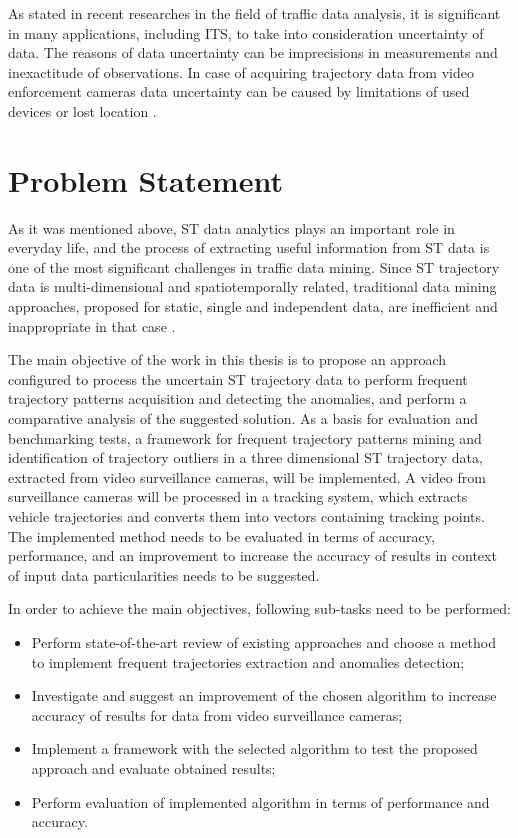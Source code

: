 As stated in recent researches in the field of traffic data analysis, it is significant in many applications, including ITS, to take into consideration uncertainty of data. The reasons of data uncertainty can be imprecisions in measurements and inexactitude of observations. In case of acquiring trajectory data from video enforcement cameras data uncertainty can be caused by limitations of used devices or lost location \cite{inproceedings:14_mpfstsp_gp_ud}.

\section{Problem Statement}

As it was mentioned above, ST data analytics plays an important role in everyday life, and the process of extracting useful information from ST data is one of the most significant challenges in traffic data mining. Since ST trajectory data is multi-dimensional and spatiotemporally related, traditional data mining approaches, proposed for static, single and independent data, are inefficient and inappropriate in that case \cite{article:8_review_mot_cl_alg}.

The main objective of the work in this thesis is to propose an approach configured to process the uncertain ST trajectory data to perform frequent trajectory patterns acquisition and detecting the anomalies, and perform a comparative analysis of the suggested solution. As a basis for evaluation and benchmarking tests, a framework for frequent trajectory patterns mining and identification of trajectory outliers in a three dimensional ST trajectory data, extracted from video surveillance cameras, will be implemented. A video from surveillance cameras will be processed in a tracking system, which extracts vehicle trajectories and converts them into vectors containing tracking points. The implemented method needs to be evaluated in terms of accuracy, performance, and an improvement to increase the accuracy of results in context of input data particularities needs to be suggested. 

In order to achieve the main objectives, following sub-tasks need to be performed:
\begin{itemize}
	\item Perform state-of-the-art review of existing approaches and choose a method to implement frequent trajectories extraction and anomalies detection;
	\item Investigate and suggest an improvement of the chosen algorithm to increase accuracy of results for data from video surveillance cameras;
	\item Implement a framework with the selected algorithm to test the proposed approach and evaluate obtained results;
	\item Perform evaluation of implemented algorithm in terms of performance and accuracy.
\end{itemize}


